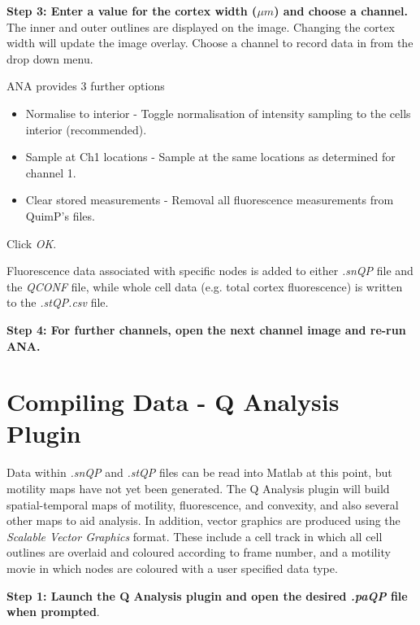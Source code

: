 \documentclass[a4paper,12pt]{article}
\begin{document}
\textbf{Step 3: Enter a value for the cortex width ($\mu m$) and choose a channel.}  The inner and outer outlines
are displayed on the image.  Changing the cortex width will update the image overlay.
Choose a channel to record data in from the drop down menu.

ANA provides 3 further options
\begin{itemize}
	\item Normalise to interior - Toggle normalisation of intensity sampling to the cells interior (recommended).
	\item Sample at Ch1 locations - Sample at the same locations as determined for channel 1.
	\item Clear stored measurements - Removal all fluorescence measurements from QuimP's files.
\end{itemize}

Click \textit{OK}.
  
Fluorescence data associated with specific nodes is added to either \textit{.snQP} 
file and the \textit{QCONF} file, while whole cell data (e.g. total cortex fluorescence) is written to the \textit{.stQP.csv} file.

\textbf{Step 4: For further channels, open the next channel image and re-run ANA.}

\section{Compiling Data - Q Analysis Plugin}

Data within \textit{.snQP} and \textit{.stQP} files can be read into Matlab at this point, but motility maps have not yet been generated.
The Q Analysis plugin will build spatial-temporal maps of motility, fluorescence, and convexity,
and also several other maps to aid analysis.  In addition, vector graphics are produced 
using the \textit{Scalable Vector Graphics} format.  These include a cell track in which all cell outlines are overlaid and coloured
according to frame number, and a motility movie in which nodes are coloured with a user specified data type.

\textbf{Step 1: Launch the Q Analysis plugin and open the desired \textit{.paQP} file when prompted}.
\end{document}
